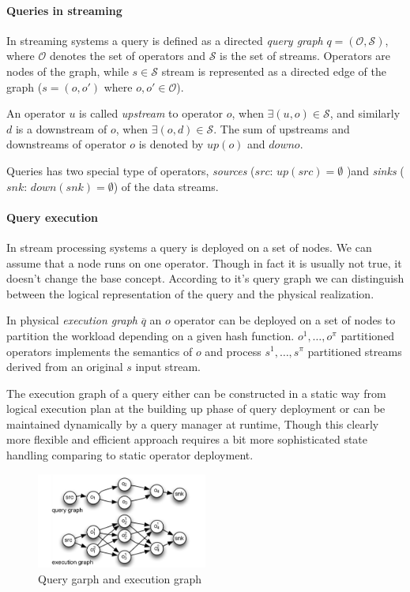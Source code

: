 \paragraph{Queries in streaming}
In streaming systems a query is defined as a directed \textit{query graph} $ q= (\mathcal{O},\mathcal{S})$, where $\mathcal{O}$ denotes the set of operators and $\mathcal{S}$ is the set of streams. Operators are nodes of the graph, while $s \in \mathcal{S}$ stream is represented as a directed edge of the graph ($s=(o,o')$ where ${o,o'}\in \mathcal{O}$). 

An operator $u$ is called \textit{upstream} to operator $o$, when $\exists(u,o) \in \mathcal{S}$, and similarly $d$ is a downstream of $o$, when $\exists(o,d) \in \mathcal{S}$. The sum of upstreams and downstreams of operator $o$ is denoted by $up(o)$ and $down{o}$.

Queries has two special type of operators, \textit{sources} ($src$: $up(src)=\emptyset$ )and \textit{sinks} ($snk$: $down(snk)=\emptyset$) of the data streams.\cite{pietzuch:intscaleoutandft}
\paragraph{Query execution} 
In stream processing systems a query is deployed on a set of nodes. We can assume that a node runs on one operator. Though in fact it is usually not true, it doesn't change the base concept. According to it's query graph we can distinguish between the logical representation of the query and the physical realization.

In physical \textit{execution graph} $\overline{q}$ an $o$ operator can be deployed on a set of nodes to partition the workload depending on a given hash function. $o^1,\dots,o^{\pi}$ partitioned operators implements the semantics of $o$ and process $s^1,\dots,s^\pi$ partitioned streams derived from an original $s$ input stream. 

The execution graph of a query either can be constructed in a static way from logical execution plan at the building up phase of query deployment or can be maintained dynamically by a query manager at runtime, Though this clearly more flexible and efficient approach requires a bit more sophisticated state handling comparing to static operator deployment.\cite{pietzuch:intscaleoutandft}
\begin{figure}[!ht]
  \centering    
      \includegraphics[width=0.5\textwidth]{figures/query_exec_graph.png}
  \caption{Query garph and execution graph \cite{pietzuch:intscaleoutandft}}
  \label{fig:gradient_descent_error_surface}
\end{figure} 
